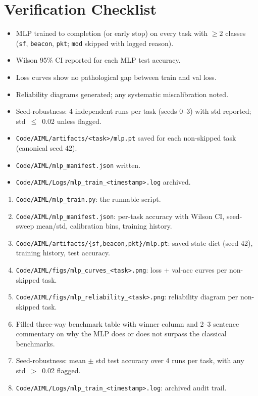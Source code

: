 \documentclass[11pt,letterpaper]{article}
\begin{document}
\section{Verification Checklist}
\begin{itemize}[leftmargin=2em]
	\item[$\square$] \mbox{MLP} trained to completion (or early stop) on every task with $\geq 2$ classes (\texttt{sf}, \texttt{beacon}, \texttt{pkt}; \texttt{mod} skipped with logged reason).
	\item[$\square$] Wilson 95\% CI reported for each \mbox{MLP} test accuracy.
	\item[$\square$] Loss curves show no pathological gap between train and val loss.
	\item[$\square$] Reliability diagrams generated; any systematic miscalibration noted.
	\item[$\square$] Seed-robustness: 4 independent runs per task (seeds 0--3) with std reported; std~$\leq$~0.02 unless flagged.
	\item[$\square$] \texttt{Code/AIML/artifacts/<task>/mlp.pt} saved for each non-skipped task (canonical seed 42).
	\item[$\square$] \texttt{Code/AIML/mlp\_manifest.json} written.
	\item[$\square$] \texttt{Code/AIML/Logs/mlp\_train\_<timestamp>.log} archived.
\end{itemize}

\begin{tcolorbox}[deliverable={Lab Handout 4-E Deliverable}]
	\begin{enumerate}[leftmargin=1.2em]
		\item \texttt{Code/AIML/mlp\_train.py}: the runnable script.
		\item \texttt{Code/AIML/mlp\_manifest.json}: per-task accuracy with Wilson CI, seed-sweep mean/std, calibration bins, training history.
		\item \texttt{Code/AIML/artifacts/\{sf,beacon,pkt\}/mlp.pt}: saved state dict (seed 42), training history, test accuracy.
		\item \texttt{Code/AIML/figs/mlp\_curves\_<task>.png}: loss + val-acc curves per non-skipped task.
		\item \texttt{Code/AIML/figs/mlp\_reliability\_<task>.png}: reliability diagram per non-skipped task.
		\item Filled three-way benchmark table with winner column and 2--3 sentence commentary on why the \mbox{MLP} does or does not surpass the classical benchmarks.
		\item Seed-robustness: mean $\pm$ std test accuracy over 4 runs per task, with any std~$>$~0.02 flagged.
		\item \texttt{Code/AIML/Logs/mlp\_train\_<timestamp>.log}: archived audit trail.
	\end{enumerate}
\end{tcolorbox}

\printhandoutglossary
\end{document}
